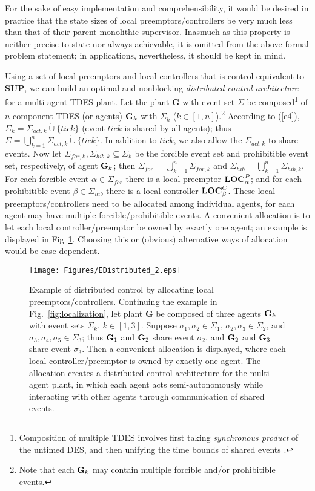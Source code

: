\documentclass[twocolumn]{autart}
\begin{document}
For the sake of easy implementation and comprehensibility, it would
be desired in practice that the state sizes of local
preemptors/controllers be very much less than that of their parent
monolithic supervisor. Inasmuch as this property is neither precise
to state nor always achievable, it is omitted from the above formal
problem statement; in applications, nevertheless, it should be kept
in mind.

Using a set of local preemptors and local controllers that is
control equivalent to {\bf SUP}, we can build an optimal and
nonblocking \emph{distributed control architecture} for a
multi-agent TDES plant. Let the plant $\textbf{G}$ with event set
$\Sigma$ be composed\footnote{Composition of multiple TDES involves
first taking \emph{synchronous product} of the untimed DES, and then
unifying the time bounds of shared events
\cite{BrandinWonham:94,Wonham:2011a}.} of $n$ component TDES (or
agents) ${\bf G}_k$ with $\Sigma_k$ ($k \in
[1,n]$).\footnote{ Note that each ${\bf G}_k$ may contain
multiple forcible and/or prohibitible events.} According to
(\ref{e4}), $\Sigma_k = \Sigma_{act,k} \dot{\cup} \{tick\}$ (event
$tick$ is shared by all agents); thus $\Sigma = \bigcup_{k=1}^n
\Sigma_{act,k} \dot{\cup} \{tick\}$. In addition to $tick$, we also
allow the $\Sigma_{act,k}$ to share events. Now let $\Sigma_{for,k},
\Sigma_{hib,k} \subseteq \Sigma_k$ be the forcible event set and
prohibitible event set, respectively, of agent ${\bf G}_k$; then
$\Sigma_{for} = \bigcup_{k=1}^n \Sigma_{for,k}$ and $\Sigma_{hib} =
\bigcup_{k=1}^n \Sigma_{hib,k}$. For each forcible event $\alpha \in
\Sigma_{for}$ there is a local preemptor ${\bf LOC}^P_{\alpha}$; and
for each prohibitible event $\beta \in \Sigma_{hib}$ there is a
local controller ${\bf LOC}^C_{\beta}$. { These local
preemptors/controllers need to be allocated among individual agents,
for each agent may have multiple forcible/prohibitible events.} A
convenient allocation is to let each local controller/preemptor be
owned by exactly one agent; an example is displayed in
Fig~\ref{fig:allocation}. Choosing this or (obvious) alternative
ways of allocation would be case-dependent.

\begin{figure}[!t]
\begin{center}
\texttt{[image: Figures/EDistributed\_2.eps]}
\caption{Example of distributed control by allocating local
preemptors/controllers. Continuing the example in
Fig.~\ref{fig:localization}, let plant $\textbf{G}$ be composed of
three agents ${\bf G}_k$ with event sets $\Sigma_k$, $k \in [1,3]$.
Suppose $\sigma_1,\sigma_2 \in \Sigma_1$, $\sigma_2, \sigma_3 \in
\Sigma_2$, and $\sigma_3, \sigma_4, \sigma_5 \in \Sigma_3$; thus
${\bf G}_1$ and ${\bf G}_2$ share event $\sigma_2$, and ${\bf G}_2$
and ${\bf G}_3$ share event $\sigma_3$. Then a convenient allocation
is displayed, where each local controller/preemptor is owned by
exactly one agent. The allocation creates a distributed control
architecture for the multi-agent plant, in which each agent acts
semi-autonomously while interacting with other agents through
communication of shared events.} \label{fig:allocation}
\end{center}
\end{figure}
\end{document}
